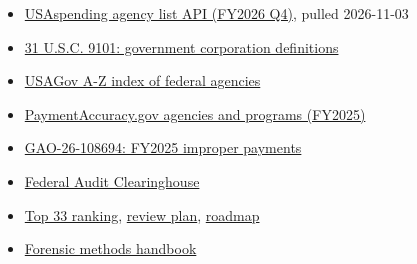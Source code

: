 \documentclass[letterpaper,11pt]{article}
\providecommand{\tightlist}{\setlength{\itemsep}{0pt}\setlength{\parskip}{0pt}}
\begin{document}
\begin{itemize}
\tightlist
\item
  \href{https://api.usaspending.gov/api/v2/references/toptier_agencies/}{USAspending
  agency list API (FY2026 Q4)}, pulled 2026-11-03
\item
  \href{https://www.law.cornell.edu/uscode/text/31/9101}{31 U.S.C. 9101:
  government corporation definitions}
\item
  \href{https://www.usa.gov/agency-index}{USAGov A-Z index of federal
  agencies}
\item
  \href{https://paymentaccuracy.gov/agencies-and-programs}{PaymentAccuracy.gov
  agencies and programs (FY2025)}
\item
  \href{https://www.gao.gov/products/gao-26-108694}{GAO-26-108694:
  FY2025 improper payments}
\item
  \href{https://www.fac.gov/}{Federal Audit Clearinghouse}
\item
  \href{../agencies/top33.pdf}{Top 33 ranking},
  \href{../review_plan.pdf}{review plan}, \href{../roadmap.pdf}{roadmap}
\item
  \href{../playbook/forensic_methods.pdf}{Forensic methods handbook}
\end{itemize}
\end{document}
